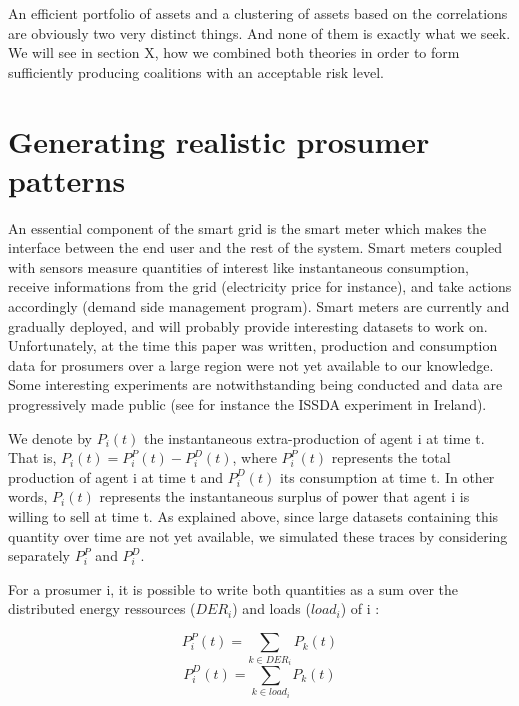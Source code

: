 \documentclass[conference]{IEEEtran}
\begin{document}
An efficient portfolio of assets and a clustering of assets based on the correlations are obviously two very distinct things. And none of them is exactly what we seek. We will see in section X, how we combined both theories in order to form sufficiently producing coalitions with an acceptable risk level.

%
%

\section{Generating realistic prosumer patterns}
\label{sec:data}

An essential component of the smart grid is the smart meter which makes the interface between the end user and the rest of the system. Smart meters coupled with sensors measure quantities of interest like instantaneous consumption, receive informations from the grid (electricity price for instance), and take actions accordingly (demand side management program). Smart meters are currently and gradually deployed, and will probably provide interesting datasets to work on. Unfortunately, at the time this paper was written, production and consumption data for prosumers over a large region were not yet available to our knowledge. Some interesting experiments are notwithstanding being conducted and data are progressively made public (see for instance the ISSDA experiment in Ireland). 

We denote by $ P_{i}(t) $ the instantaneous extra-production of agent i at time t. That is, $ P_{i}(t) = P_{i}^{P}(t) - P_{i}^{D}(t) $, where $ P_{i}^{P}(t) $ represents the total production of agent i at time t and $ P_{i}^{D}(t) $ its consumption at time t. In other words, $ P_{i}(t) $ represents the instantaneous surplus of power that agent i is willing to sell at time t. As explained above, since large datasets containing this quantity over time are not yet available, we simulated these traces by considering separately $ P_{i}^{P} $ and $ P_{i}^{D} $.

For a prosumer i, it is possible to write both quantities as a sum over the distributed energy ressources ($ DER_{i} $) and loads ($ load_{i} $) of i : 

\begin{equation}
P_{i}^{P}(t) = \sum_{k \in DER_{i}} P_{k}(t)
\end{equation}
\begin{equation}
P_{i}^{D}(t) = \sum_{k \in load_{i}} P_{k}(t)
\end{equation}
\end{document}
